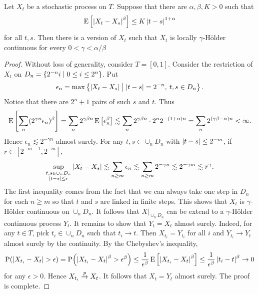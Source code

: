 \begin{theorem}
    Let $X_t$ be a stochastic process on $T$. Suppose that there 
    are $\alpha,\beta,K>0$ such that 
    \begin{equation*}
        \operatorname{E}\left[ {\left\lvert {X_t-X_s} \right\rvert^\beta} \right]\leq K\left\lvert {t-s} \right\rvert^{1+\alpha}
    \end{equation*}
    for all $t,s$. Then there is a version of $X_t$ such that 
    $X_t$ is locally $\gamma$-H\"older continuous for every 
    $0<\gamma<\alpha/\beta$
\end{theorem}
\begin{proof}
    Without loss of generality, consider $T = [0,1]$. Consider the 
    restriction of $X_t$ on $D_n = \left\{ 2^{-n}i \;\middle\vert\; 0\leq i\leq 2^n \right\}$. 
    Put 
    \begin{equation*}
        \epsilon_n = \max\left\{ \left\lvert {X_t-X_s} \right\rvert \;\middle\vert\; \left\lvert {t-s} \right\rvert=2^{-n},\: t,s\in D_n \right\}. 
    \end{equation*}  
    Notice that there are $2^{n}+1$ pairs of such $s$ and $t$. Thus 
    \begin{equation*}
        \operatorname{E}\left[ {\sum_n (2^{\gamma n}\epsilon_n)^\beta} \right] 
        = \sum_n 2^{\gamma\beta n}\operatorname{E}\left[ {\epsilon_n^\beta} \right]
        \lesssim \sum_n 2^{\gamma\beta n}\cdot 2^n 2^{-(1+\alpha)n} = \sum_n 2^{(\gamma\beta - \alpha)n}<\infty.
    \end{equation*}
    Hence $\epsilon_n\lesssim 2^{-\gamma n}$ almost surely. For 
    any $t,s\in \cup_n D_n$ with $\left\lvert {t-s} \right\rvert\leq 2^{-m}$, if $r\in [2^{-m-1},2^{-m}]$, 
    \begin{equation*}
        \sup_{\substack{t,s\in \cup_n D_n \\ \left\lvert {t-s} \right\rvert\leq r}}\left\lvert {X_t-X_s} \right\rvert 
        \lesssim \sum_{n\geq m}\epsilon_n\lesssim \sum_{n\geq m}2^{-\gamma n} 
        \lesssim 2^{-\gamma m}\lesssim r^\gamma. 
    \end{equation*} 
    The first inequality comes from the fact that we can always take one 
    step in $D_n$ for each $n\geq m$ so that $t$ and $s$ are linked in 
    finite steps. This shows that $X_t$ is $\gamma$-H\"older continuous 
    on $\cup_n D_n$. It follows that $X|_{\cup_nD_n}$ can be extend to a 
    $\gamma$-H\"older continuous process $Y_t$. It remains to show that 
    $Y_t = X_t$ almost surely. Indeed, for any $t\in T$, pick $t_i\in \cup_nD_n$ 
    such that $t_i\to t$. Then $X_{t_i} = Y_{t_i}$ for all $i$ and $Y_{t_i}\to Y_t$ 
    almost surely by the continuity. By the Chebyshev's inequality, 
    \begin{equation*}
        \P\pth{\abs{X_{t_i}-X_t}> \epsilon} = \P\pth{\abs{X_{t_i}-X_t}^\beta> \epsilon^\beta}
        \leq \frac{1}{\epsilon^\beta}\E\sbrc{\abs{X_{t_i}-X_t}^\beta}\leq \frac{1}{\epsilon^\beta}\abs{t_i-t}^\beta\to 0
    \end{equation*}
    for any $\epsilon>0$. Hence $X_{t_i}\overset{p}{\to} X_t$. It follows that 
    $X_t = Y_t$ almost surely. The proof is complete. 
\end{proof}

